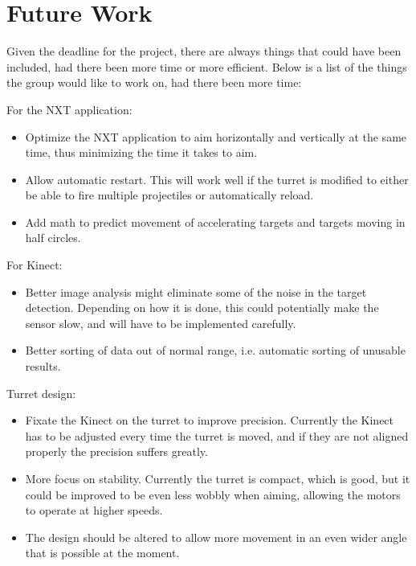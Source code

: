 \section{Future Work}
Given the deadline for the project, there are always things that could have been included, had there been more time or more efficient. Below is a list of the things the group would like to work on, had there been more time:

For the NXT application:
\begin{itemize}
	\item Optimize the NXT application to aim horizontally and vertically at the same time, thus minimizing the time it takes to aim.
	\item Allow automatic restart. This will work well if the turret is modified to either be able to fire multiple projectiles or automatically reload.
	\item Add math to predict movement of accelerating targets and targets moving in half circles.
\end{itemize}

For Kinect:
\begin{itemize}
	\item Better image analysis might eliminate some of the noise in the target detection. Depending on how it is done, this could potentially make the sensor slow, and will have to be implemented carefully.
	\item Better sorting of data out of normal range, i.e. automatic sorting of unusable results. 
\end{itemize}

Turret design:
\begin{itemize}
	\item Fixate the Kinect on the turret to improve precision. Currently the Kinect has to be adjusted every time the turret is moved, and if they are not aligned properly the precision suffers greatly.
	\item More focus on stability. Currently the turret is compact, which is good, but it could be improved to be even less wobbly when aiming, allowing the motors to operate at higher speeds.
	\item The design should be altered to allow more movement in an even wider angle that is possible at the moment. 
\end{itemize}